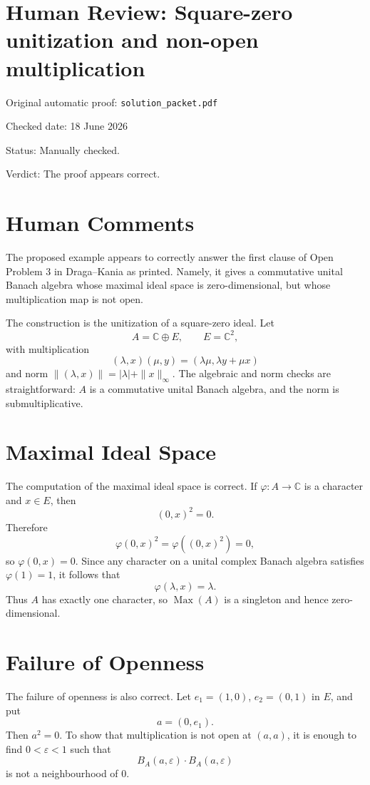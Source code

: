 \documentclass[11pt]{article}
\newcommand{\C}{\mathbb C}
\newcommand{\Max}{\operatorname{Max}}
\begin{document}
\section*{Human Review: Square-zero unitization and non-open multiplication}

\noindent Original automatic proof: \texttt{solution\_packet.pdf}

\noindent Checked date: 18 June 2026

\noindent Status: Manually checked.

\noindent Verdict: The proof appears correct.

\section*{Human Comments}

The proposed example appears to correctly answer the first clause of Open
Problem 3 in Draga--Kania as printed.  Namely, it gives a commutative unital
Banach algebra whose maximal ideal space is zero-dimensional, but whose
multiplication map is not open.

The construction is the unitization of a square-zero ideal.  Let
\[
  A=\C\oplus E,
  \qquad E=\C^2,
\]
with multiplication
\[
  (\lambda,x)(\mu,y)=(\lambda\mu,\lambda y+\mu x)
\]
and norm \(\|(\lambda,x)\|=|\lambda|+\|x\|_\infty\).  The algebraic and norm
checks are straightforward: \(A\) is a commutative unital Banach algebra, and
the norm is submultiplicative.

\section*{Maximal Ideal Space}

The computation of the maximal ideal space is correct.  If
\(\varphi:A\to\C\) is a character and \(x\in E\), then
\[
  (0,x)^2=0.
\]
Therefore
\[
  \varphi(0,x)^2=\varphi((0,x)^2)=0,
\]
so \(\varphi(0,x)=0\).  Since any character on a unital complex Banach
algebra satisfies \(\varphi(1)=1\), it follows that
\[
  \varphi(\lambda,x)=\lambda.
\]
Thus \(A\) has exactly one character, so \(\Max(A)\) is a singleton and hence
zero-dimensional.

\section*{Failure of Openness}

The failure of openness is also correct.  Let \(e_1=(1,0)\), \(e_2=(0,1)\) in
\(E\), and put
\[
  a=(0,e_1).
\]
Then \(a^2=0\).  To show that multiplication is not open at \((a,a)\), it is
enough to find \(0<\varepsilon<1\) such that
\[
  B_A(a,\varepsilon)\cdot B_A(a,\varepsilon)
\]
is not a neighbourhood of \(0\).
\end{document}

